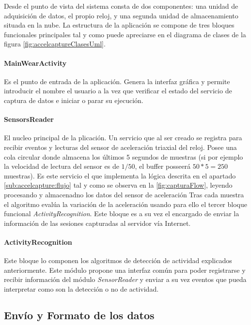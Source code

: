 Desde el punto de vista del sistema consta de dos componentes: una unidad de adquisición de datos, el propio reloj, y una segunda unidad de almacenamiento situada en la nube. La estructura de la aplicación se compone de tres bloques funcionales principales tal y como puede apreciarse en el diagrama de clases de la figura \ref{fig:accelcaptureClasesUml}.



\paragraph{MainWearActivity}
Es el punto de entrada de la aplicación. Genera la interfaz gráfica y permite introducir el nombre el usuario a la vez que verificar el estado del servicio de captura de datos e iniciar o parar su ejecución.

\paragraph{SensorsReader}
El nucleo principal de la plicación. Un servicio que al ser creado se registra para recibir eventos y lecturas del sensor de aceleración triaxial del reloj. Posee una cola circular donde almacena los últimos 5 segundos de muestras (si por ejemplo la velocidad de lectura del sensor es de $1/50$, el buffer posseerá $50 * 5 = 250$ muestras).
Es este servicio el que implementa la lógica descrita en el apartado \ref{sub:accelcapture:flujo} tal y como se observa en la \autoref{fig:capturaFlow}, leyendo procesando y almacenadno los datos del sensor de aceleración  Tras cada muestra el algoritmo evalúa la variación de la aceleración usando para ello el tercer bloque funcional \textit{ActivityRecognition}. Este bloque es a su vez el encargado de enviar la información de las sesiones capturadas al servidor vía Internet.

\paragraph{ActivityRecognition}
Este bloque lo componen los algoritmos de detección de actividad explicados anteriormente. Este módulo propone una interfaz común para poder registrarse y recibir información del módulo \textit{SensorReader} y enviar a su vez eventos que pueda interpretar como son la detección o no de actividad.


\subsection{Envío y Formato de los datos}\label{sub:accelcapture:red}

